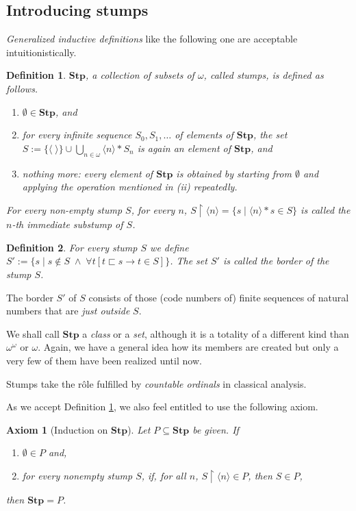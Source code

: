 \documentclass[a4paper]{amsart}
\theoremstyle{plain}
\newtheorem{axiom}{Axiom}
\newtheorem{definition}{Definition}
\begin{document}
\subsection{Introducing stumps}{\it Generalized inductive definitions} like the following one are acceptable intuitionistically. 
\begin{definition}\label{D:stp} 
$\mathbf{Stp}$, a collection  of  subsets of $\omega$, called \emph{stumps}, is defined as follows. 

\begin{enumerate}[\upshape (i)]
\item $\emptyset \in \mathbf{Stp}$, and
\item for every infinite sequence $S_0, S_1, \ldots$ of elements of $\mathbf{Stp}$,  the set \\$S:= \{\langle \;\rangle\}\cup\bigcup\limits_{n \in \omega}\langle
 n \rangle \ast S_n$ is again an element of $\mathbf{Stp}$, and
\item nothing more: every element of $\mathbf{Stp}$ is obtained by starting from $\emptyset$ and applying the operation mentioned in (ii) repeatedly. \end{enumerate}

For every non-empty stump $S$, for every $n$, $S\upharpoonright\langle n \rangle = \{s\mid \langle n \rangle \ast s \in S\}$ is called the $n$-th \emph{immediate substump} of $S$. 
\end{definition}
\begin{definition} For every stump $S$  we define $S':=\{s\mid s\notin S \;\wedge\;\forall t[t\sqsubset s\rightarrow t \in S]\}$. The set $S'$ is called the \emph{border of the stump $S$}. \end{definition}

The border $S'$ of $S$ consists of those (code numbers of) finite sequences of natural numbers that are {\it just outside} $S$.


We shall call $\mathbf{Stp}$ a \textit{class} or a {\it set}, although it is a totality of a different kind than $\omega^\omega$ or $\omega$. Again, we have a general idea how its members are created but only a very few of them have been realized until now.

Stumps take the r\^ole fulfilled by {\it countable ordinals} in classical analysis.

As we accept Definition \ref{D:stp}, we also feel entitled to use the following axiom.

\begin{axiom}[Induction on $\mathbf{Stp}$]\label{ax:stumpinduction} Let $P\subseteq \mathbf{Stp}$ be given. If  \begin{enumerate}[\upshape (i)] \item $\emptyset \in P$ and, \item for every nonempty stump $S$, if, for all $n$, $S\upharpoonright \langle n \rangle  \in P$, then $S\in P$,\end{enumerate} then $\mathbf{Stp}=P$. \end{axiom}
\end{document}
